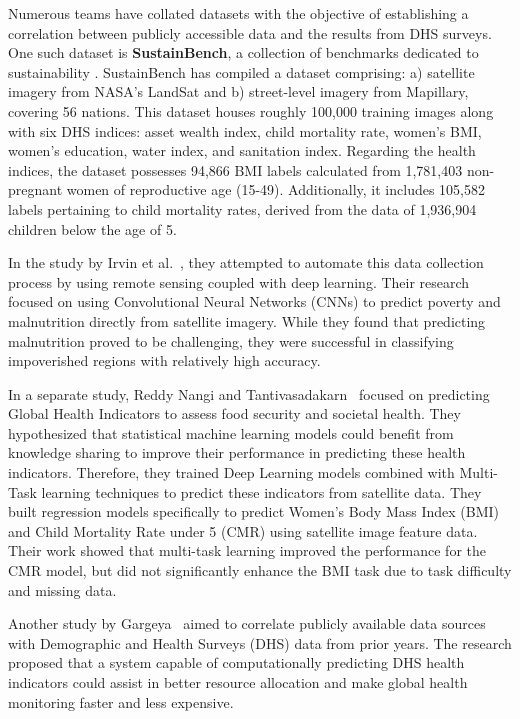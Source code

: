 \documentclass{article}
\begin{document}
Numerous teams have collated datasets with the objective of establishing a correlation between publicly accessible data and the results from DHS surveys. One such dataset is \textbf{SustainBench}, a collection of benchmarks dedicated to sustainability \cite{yeh2021sustainbench}. SustainBench has compiled a dataset comprising: a) satellite imagery from NASA's LandSat and b) street-level imagery from Mapillary, covering 56 nations. This dataset houses roughly 100,000 training images along with six DHS indices: asset wealth index, child mortality rate, women's BMI, women's education, water index, and sanitation index. Regarding the health indices, the dataset possesses 94,866 BMI labels calculated from 1,781,403 non-pregnant women of reproductive age (15-49). Additionally, it includes 105,582 labels pertaining to child mortality rates, derived from the data of 1,936,904 children below the age of 5.

In the study by Irvin et al.~\cite{irvin}, they attempted to automate this data collection process by using remote sensing coupled with deep learning. Their research focused on using Convolutional Neural Networks (CNNs) to predict poverty and malnutrition directly from satellite imagery. While they found that predicting malnutrition proved to be challenging, they were successful in classifying impoverished regions with relatively high accuracy.

In a separate study, Reddy Nangi and Tantivasadakarn~\cite{reddynangi} focused on predicting Global Health Indicators to assess food security and societal health. They hypothesized that statistical machine learning models could benefit from knowledge sharing to improve their performance in predicting these health indicators. Therefore, they trained Deep Learning models combined with Multi-Task learning techniques to predict these indicators from satellite data. They built regression models specifically to predict Women's Body Mass Index (BMI) and Child Mortality Rate under 5 (CMR) using satellite image feature data. Their work showed that multi-task learning improved the performance for the CMR model, but did not significantly enhance the BMI task due to task difficulty and missing data.

Another study by Gargeya~\cite{gargeya} aimed to correlate publicly available data sources with Demographic and Health Surveys (DHS) data from prior years. The research proposed that a system capable of computationally predicting DHS health indicators could assist in better resource allocation and make global health monitoring faster and less expensive.
\end{document}
